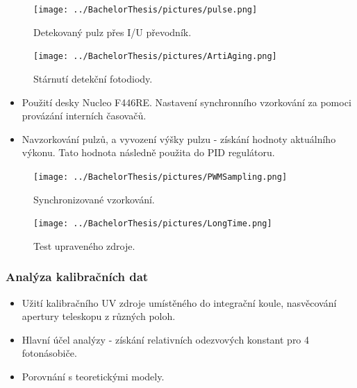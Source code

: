 \documentclass{beamer}
\begin{document}
\begin{frame}

 \begin{figure}[H]
 \centering
 \texttt{[image: ../BachelorThesis/pictures/pulse.png]}
 \caption{Detekovaný pulz přes I/U převodník.}
 \label{UVsource}
\end{figure}


\end{frame}






\begin{frame}

 \begin{figure}[H]
 \centering
 \texttt{[image: ../BachelorThesis/pictures/ArtiAging.png]}
 \caption{Stárnutí detekční fotodiody.}
 \label{UVsource}
\end{figure}


\end{frame}



\begin{frame}

\begin{itemize}
 \item 
 Použití desky Nucleo F446RE. Nastavení synchronního vzorkování za pomoci provázání interních časovačů.
 \item 
 Navzorkování pulzů, a vyvození výšky pulzu - získání hodnoty aktuálního výkonu. Tato hodnota následně použita do PID regulátoru. 
 
 \end{itemize}
 \begin{figure}[H]
 \centering
 \texttt{[image: ../BachelorThesis/pictures/PWMSampling.png]}
 \caption{Synchronizované vzorkování.}
 \label{UVsource}
\end{figure}


\end{frame}


\begin{frame}

 \begin{figure}[H]
 \centering
 \texttt{[image: ../BachelorThesis/pictures/LongTime.png]}
 \caption{Test upraveného zdroje.}
 \label{UVsource}
\end{figure}


\end{frame}



\begin{frame}
\frametitle{Analýza kalibračních dat}
\begin{itemize}
 \item Užití kalibračního UV zdroje umístěného do integrační koule, nasvěcování apertury teleskopu z různých poloh. 
 \item Hlavní účel analýzy - získání relativních odezvových konstant pro 4 fotonásobiče.
 \item Porovnání s teoretickými modely.
 
 
 
 \end{itemize}
 \end{frame}  
 
\end{document}
